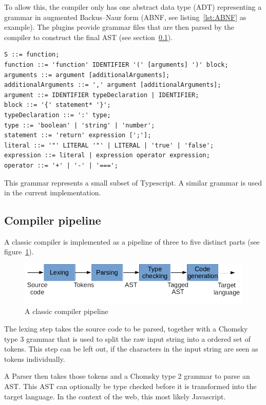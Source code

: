 To allow this, the compiler only has one abstract data type (ADT) representing a grammar in  augmented Backus--Naur form (ABNF, see listing~\ref{lst:ABNF} as example). The plugins provide grammar files that are then parsed by the compiler to construct the final AST (see section~\ref{sec:pipeline}).

\begin{lstlisting}[linewidth=\columnwidth, caption={Simple example of ABNF grammar}, captionpos=b, label=lst:ABNF]
S ::= function;
function ::= 'function' IDENTIFIER '(' [arguments] ')' block;
arguments ::= argument [additionalArguments];
additionalArguments ::= ',' argument [additionalArguments];
argument ::= IDENTIFIER typeDeclaration | IDENTIFIER;
block ::= '{' statement* '}';
typeDeclaration ::= ':' type;
type ::= 'boolean' | 'string' | 'number';
statement ::= 'return' expression [';'];
literal ::= '"' LITERAL '"' | LITERAL | 'true' | 'false';
expression ::= literal | expression operator expression;
operator ::= '+' | '-' | '===';
\end{lstlisting}

This grammar represents a small subset of Typescript. A similar grammar is used in the current implementation.

\subsection{Compiler pipeline}
\label{sec:pipeline}

A classic compiler is implemented as a pipeline of three to five distinct parts (see figure~\ref{fig:compiler_pipeline}).

\begin{figure}[H]
\includegraphics[width=\columnwidth]{./compiler_pipeline.png}
\caption{A classic compiler pipeline}%
\label{fig:compiler_pipeline}
\end{figure}

The lexing step takes the source code to be parsed, together with a Chomsky type 3 grammar \cite{chomsky} that is used to split the raw input string into a ordered set of tokens. This step can be left out, if the characters in the input string are seen as tokens individually.

A Parser then takes those tokens and a Chomsky type 2 grammar to parse an AST\@. This AST can optionally be type checked before it is transformed into the target language. In the context of the web, this most likely Javascript.

